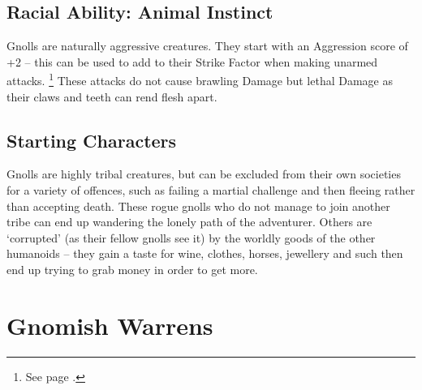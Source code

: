 \begin{multicols}{2}
\subsection{Racial Ability: Animal Instinct}

Gnolls are naturally aggressive creatures.
They start with an Aggression score of +2 -- this can be used to add to their Strike Factor when making unarmed attacks.%
\footnote{See page \pageref{aggression}.}
These attacks do not cause brawling Damage but lethal Damage as their claws and teeth can rend flesh apart.

\subsection{Starting Characters}

Gnolls are highly tribal creatures, but can be excluded from their own societies for a variety of offences, such as failing a martial challenge and then fleeing rather than accepting death.
These rogue gnolls who do not manage to join another tribe can end up wandering the lonely path of the adventurer.
Others are `corrupted' (as their fellow gnolls see it) by the worldly goods of the other humanoids -- they gain a taste for wine, clothes, horses, jewellery and such then end up trying to grab money in order to get more.

\end{multicols}

\section[Gnomes]{Gnomish Warrens}

